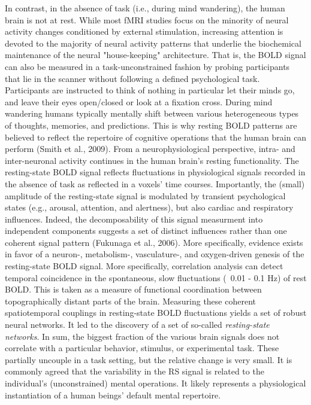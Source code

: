 \documentclass[authoryear,review,3p]{elsarticle}
\begin{document}
In contrast,
in the absence of task (i.e., during mind wandering),
the human brain is not at rest.
While most fMRI studies focus on the minority of neural activity changes
conditioned by external stimulation,
increasing attention is devoted to
the majority of neural activity patterns
that underlie the biochemical maintenance of
the neural "house-keeping" architecture.
That is,
the BOLD signal can also be measured in a task-unconstrained fashion
by probing participants that lie in the scanner without following
a defined psychological task.
Participants are instructed to think of nothing in particular
let their minds go, and leave their eyes open/closed or
look at a fixation cross. During mind wandering humans typically mentally shift
between various heterogeneous types of thoughts, memories, and predictions.
This is why resting BOLD patterns are believed to reflect the repertoire of
cognitive operations that the human brain can perform (Smith et al., 2009).
%
From a neurophysiological perspective,
intra- and inter-neuronal activity continues
in the human brain's resting functionality.
The resting-state BOLD signal reflects fluctuations in
physiological signals recorded in the absence of task
as reflected in a voxels' time courses.
Importantly, the (small) amplitude of the resting-state signal is modulated by
transient psychological states (e.g., arousal, attention, and alertness),
but also cardiac and respiratory influences.
Indeed, the decomposability of this signal measurment into independent
components suggests a set of distinct influences rather
than one coherent signal pattern (Fukunaga et al., 2006).
More specifically, evidence exists in favor of a neuron-, metabolism-,
vasculature-, and oxygen-driven genesis of the resting-state BOLD signal. 
%
More specifically,
correlation analysis can detect temporal coincidence in
the spontaneous, slow fluctuations (~0.01 - 0.1 Hz) of rest BOLD.
This is taken as a measure of functional coordination between
topographically distant parts of the brain.
Measuring these coherent spatiotemporal couplings in resting-state BOLD
fluctuations yields a set of robust neural networks.
It led to the discovery of a set of so-called
\textit{resting-state networks}.
%
In sum, the biggest fraction of the various brain
signals does not correlate with a particular
behavior, stimulus, or experimental task.
These partially uncouple in a task setting,
but the relative change is very small.
It is commonly agreed that the variability in the RS signal is
related to the individual's (unconstrained) mental operations.
It likely represents a physiological
instantiation of a human beings' default mental repertoire.
\end{document}
